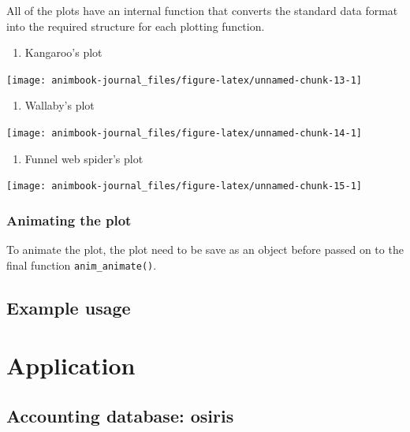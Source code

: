 All of the plots have an internal function that converts the standard data format into the required structure for each plotting function.

\begin{enumerate}
\def\labelenumi{\arabic{enumi}.}
\tightlist
\item
  Kangaroo's plot
\end{enumerate}

\texttt{[image: animbook-journal\_files/figure-latex/unnamed-chunk-13-1]}

\begin{enumerate}
\def\labelenumi{\arabic{enumi}.}
\setcounter{enumi}{1}
\tightlist
\item
  Wallaby's plot
\end{enumerate}

\texttt{[image: animbook-journal\_files/figure-latex/unnamed-chunk-14-1]}

\begin{enumerate}
\def\labelenumi{\arabic{enumi}.}
\setcounter{enumi}{2}
\tightlist
\item
  Funnel web spider's plot
\end{enumerate}

\texttt{[image: animbook-journal\_files/figure-latex/unnamed-chunk-15-1]}

\hypertarget{animating-the-plot}{%
\subsubsection{Animating the plot}\label{animating-the-plot}}

To animate the plot, the plot need to be save as an object before passed on to the final function \texttt{anim\_animate()}.

\hypertarget{example-usage}{%
\subsection{Example usage}\label{example-usage}}

\hypertarget{application}{%
\section{Application}\label{application}}

\hypertarget{accounting-database-osiris}{%
\subsection{Accounting database: osiris}\label{accounting-database-osiris}}


